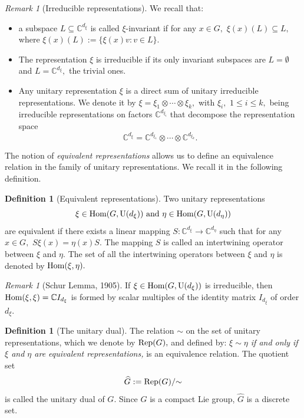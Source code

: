 \documentclass[12pt, reqno]{amsart}
\theoremstyle{definition}
\newtheorem{definition}[theorem]{Definition}
\theoremstyle{remark}
\newtheorem{remark}[theorem]{Remark}
\numberwithin{equation}{section}
\begin{document}
\begin{remark}[Irreducible representations]  We recall that:
\begin{itemize} 
    \item  a subspace $L\subseteq \mathbb{C}^{d_\xi}$ is called $\xi$-invariant if for any $x\in G,$ $\xi(x)(L)\subseteq L,$ where $\xi(x)(L):=\{\xi(x)v:v\in L\}.$
    \item The representation $\xi$ is irreducible if its only invariant subspaces are $L=\emptyset$ and $L=\mathbb{C}^{d_\xi},$ the trivial ones.
    \item Any unitary representation $\xi$ is a direct sum of unitary irreducible representations. We denote it by $\xi=\xi_1\otimes \cdots\otimes \xi_k,$ with $\xi_i,$ $1\leq i\leq k,$ being irreducible representations on factors $\mathbb{C}^{d_{\xi_i}}$ that decompose the representation space $$ \mathbb{C}^{d_{\xi}}=\mathbb{C}^{d_{\xi_1}}\otimes \cdots \otimes \mathbb{C}^{d_{\xi_k}} .$$    
\end{itemize}  The notion of {\it equivalent representations} allows us to define an equivalence relation in the family of unitary representations. We recall it in the following definition.
\end{remark}
\begin{definition}[Equivalent representations]
    Two unitary representations $$ \xi\in \textnormal{Hom}(G,\textnormal{U}(d_\xi)) \textnormal{ and  }\eta\in \textnormal{Hom}(G,\textnormal{U}(d_\eta))$$  are equivalent if there exists a linear mapping $S:\mathbb{C}^{d_\xi}\rightarrow \mathbb{C}^{d_\eta}$ such that for any $x\in G,$ $S\xi(x)=\eta(x)S.$ The mapping $S$ is called an intertwining operator between $\xi$ and $\eta.$ The set of all the intertwining operators between $\xi$ and $\eta$ is denoted by $\textnormal{Hom}(\xi,\eta).$
\end{definition}
\begin{remark}[Schur Lemma, 1905]
If $\xi\in \textnormal{Hom}(G,\textnormal{U}(d_\xi)) $ is irreducible, then $\textnormal{Hom}(\xi,\xi)=\mathbb{C}I_{d_\xi}$ is formed by scalar multiples of the identity matrix  $I_{d_\xi}$ of order $d_\xi.$

\end{remark}
\begin{definition}[The unitary dual]
    The relation $\sim$ on the set of unitary representations, which we denote by $\textnormal{Rep}(G),$ and defined by: {\it $\xi\sim \eta$ if and only if $\xi$ and $\eta$ are equivalent representations,} is an equivalence relation. The quotient set
$$
    \widehat{G}:={\textnormal{Rep}(G)}/{\sim}
$$is called the unitary dual of $G.$ Since $G$ is a compact Lie group, $\widehat{G}$ is a discrete set.
\end{definition}
\end{document}
